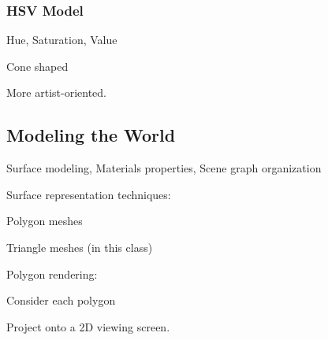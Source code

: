 \subsubsection{HSV Model}

Hue, Saturation, Value

Cone shaped

More artist-oriented.  

\subsection{Modeling the World}

Surface modeling, Materials properties, Scene graph organization

Surface representation techniques:  

\qquad Polygon meshes

\qquad Triangle meshes (in this class)

Polygon rendering:

\qquad Consider each polygon

\qquad Project onto a 2D viewing screen.  


